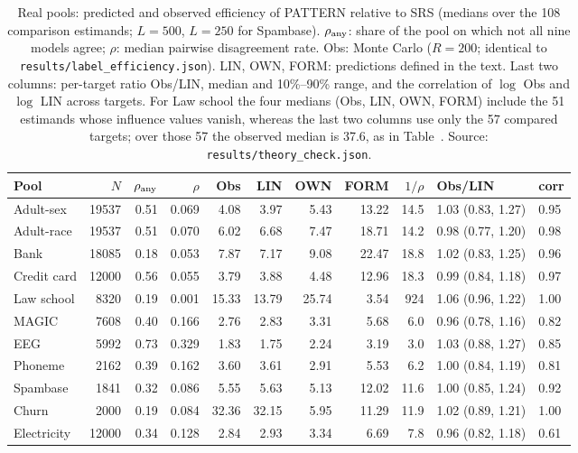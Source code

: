 \begin{table}[t]
\centering
\caption{Real pools: predicted and observed efficiency of PATTERN relative to SRS (medians over the
108 comparison estimands; $L=500$, $L=250$ for Spambase). $\rho_{\rm any}$: share of the pool on
which not all nine models agree; $\rho$: median pairwise disagreement rate. Obs: Monte Carlo
($R=200$; identical to \texttt{results/label\_efficiency.json}). LIN, OWN, FORM: predictions defined
in the text. Last two columns: per-target ratio Obs/LIN, median and 10\%--90\% range, and the
correlation of $\log$ Obs and $\log$ LIN across targets. For Law school the four medians (Obs, LIN, OWN, FORM) include the 51 estimands whose influence values vanish, whereas the last two columns use only the 57 compared targets; over those 57 the observed median is 37.6, as in Table~. Source: \texttt{results/theory\_check.json}.}
\label{tab:sim-real}
\small
\begin{tabular}{lrrrrrrrrll}
\toprule
Pool & $N$ & $\rho_{\rm any}$ & $\rho$ & Obs & LIN & OWN & FORM & $1/\rho$ & Obs/LIN & corr\\
\midrule
Adult-sex & 19537 & 0.51 & 0.069 & 4.08 & 3.97 & 5.43 & 13.22 & 14.5 & 1.03 (0.83, 1.27) & 0.95\\
Adult-race & 19537 & 0.51 & 0.070 & 6.02 & 6.68 & 7.47 & 18.71 & 14.2 & 0.98 (0.77, 1.20) & 0.98\\
Bank & 18085 & 0.18 & 0.053 & 7.87 & 7.17 & 9.08 & 22.47 & 18.8 & 1.02 (0.83, 1.25) & 0.96\\
Credit card & 12000 & 0.56 & 0.055 & 3.79 & 3.88 & 4.48 & 12.96 & 18.3 & 0.99 (0.84, 1.18) & 0.97\\
Law school & 8320 & 0.19 & 0.001 & 15.33 & 13.79 & 25.74 & 3.54 & 924 & 1.06 (0.96, 1.22) & 1.00\\
MAGIC & 7608 & 0.40 & 0.166 & 2.76 & 2.83 & 3.31 & 5.68 & 6.0 & 0.96 (0.78, 1.16) & 0.82\\
EEG & 5992 & 0.73 & 0.329 & 1.83 & 1.75 & 2.24 & 3.19 & 3.0 & 1.03 (0.88, 1.27) & 0.85\\
Phoneme & 2162 & 0.39 & 0.162 & 3.60 & 3.61 & 2.91 & 5.53 & 6.2 & 1.00 (0.84, 1.19) & 0.81\\
Spambase & 1841 & 0.32 & 0.086 & 5.55 & 5.63 & 5.13 & 12.02 & 11.6 & 1.00 (0.85, 1.24) & 0.92\\
Churn & 2000 & 0.19 & 0.084 & 32.36 & 32.15 & 5.95 & 11.29 & 11.9 & 1.02 (0.89, 1.21) & 1.00\\
Electricity & 12000 & 0.34 & 0.128 & 2.84 & 2.93 & 3.34 & 6.69 & 7.8 & 0.96 (0.82, 1.18) & 0.61\\
\bottomrule
\end{tabular}
\end{table}

